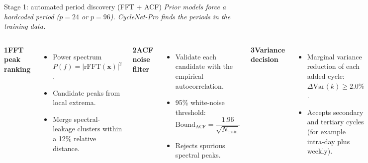 \documentclass[aspectratio=169]{beamer}
\begin{document}
\begin{frame}{Stage 1: automated period discovery (FFT + ACF)}
\small
\textit{Prior models force a hardcoded period ($p=24$ or $p=96$). CycleNet-Pro finds the periods in the training data.}\par
\vspace{0.7em}
\begin{columns}[T]
\textcolor{accent}{\textbf{1}}\quad \textbf{FFT peak ranking}\par\vspace{0.3em}
\begin{itemize}
  \setlength{\itemsep}{0.4em}
  \item Power spectrum $P(f) = |\text{rFFT}(\mathbf{x})|^2$.
  \item Candidate peaks from local extrema.
  \item Merge spectral-leakage clusters within a 12\% relative distance.
\end{itemize}
\textcolor{accent}{\textbf{2}}\quad \textbf{ACF noise filter}\par\vspace{0.3em}
\begin{itemize}
  \setlength{\itemsep}{0.4em}
  \item Validate each candidate with the empirical autocorrelation.
  \item 95\% white-noise threshold: $\text{Bound}_{\text{ACF}} = \dfrac{1.96}{\sqrt{N_{\text{train}}}}$
  \item Rejects spurious spectral peaks.
\end{itemize}
\textcolor{accent}{\textbf{3}}\quad \textbf{Variance decision}\par\vspace{0.3em}
\begin{itemize}
  \setlength{\itemsep}{0.4em}
  \item Marginal variance reduction of each added cycle: $\Delta\text{Var}(k) \ge 2.0\%$.
  \item Accepts secondary and tertiary cycles (for example intra-day plus weekly).
\end{itemize}
\end{columns}
\end{frame}
\end{document}
